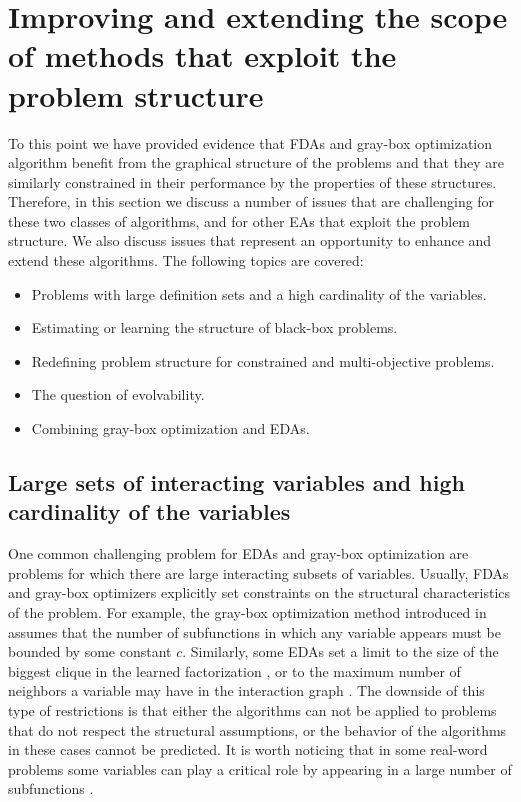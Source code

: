 \documentclass{article} %
\begin{document}




\section{Improving and extending the scope of methods that exploit the problem structure}  \label{sec:FUTURE}
 To this point we have provided evidence that FDAs and gray-box optimization algorithm benefit from the graphical structure of the problems and that they are similarly constrained in their performance by the properties of these structures. Therefore, in this section we discuss a number of issues that are challenging for these two classes of algorithms, and for other EAs that exploit the problem structure. We also discuss issues that represent an opportunity to enhance and extend these algorithms. The following topics are covered:

 \begin{itemize} 
   \item Problems with large definition sets and a high cardinality of the variables.    
   \item Estimating or learning the structure of black-box problems.   
   \item Redefining problem structure for constrained and multi-objective problems. 
   \item The question of evolvability.
   \item Combining gray-box optimization and EDAs.
 \end{itemize}  



\subsection{Large sets of interacting variables and high cardinality of the variables}
  
  One common challenging problem for EDAs and gray-box optimization are problems for which there are large interacting subsets of variables. Usually, FDAs and gray-box optimizers explicitly set constraints on the structural characteristics of the problem. For example, the gray-box optimization method introduced in \cite{Chicano_et_2014} assumes that the number of subfunctions in which any variable appears must be bounded by some constant $c$. Similarly, some EDAs set a limit to the size of the biggest clique in the learned factorization \cite{Santana_et_al:2008c,Santana_et_al:2009c}, or to the maximum number of neighbors a variable may have in the interaction graph  \cite{Shakya_et_al:2011}. The downside of this type of restrictions is that either the algorithms can not be applied to problems that do not respect the structural assumptions, or the behavior of the algorithms  in these cases cannot be predicted. It is worth noticing that in some real-word problems some variables can play a critical role by appearing in a large number of subfunctions \cite{Whitley_et_al:2013}.
\end{document}
